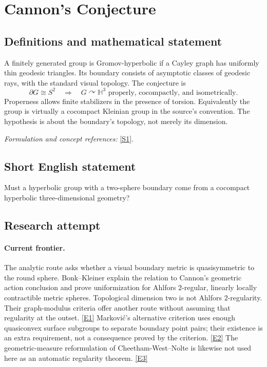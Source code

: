 \documentclass[11pt,a4paper]{article}
\newcommand{\sref}[2]{\hyperlink{source:#1:#2}{[S#2]}}
\newcommand{\eref}[2]{\hyperlink{extra:#1:#2}{[E#2]}}
\newif\ifshowcatalogue
\newcommand{\cataloguescope}[1]{\ifshowcatalogue
 \paragraph{Exact scope in the supplied catalogue.}
 \begin{quote}\small #1\end{quote}\fi}
\numberwithin{equation}{section}
\begin{document}
\setcounter{section}{0}
\clearpage
\section*{\texorpdfstring{Cannon's Conjecture}{Cannon's Conjecture}}\label{statement}
\subsection{Definitions and mathematical statement}
A finitely generated group is Gromov-hyperbolic if a Cayley graph has uniformly thin geodesic triangles. Its boundary consists of asymptotic classes of geodesic rays, with the standard visual topology. The conjecture is
\[
 \partial G\cong S^2\quad\Longrightarrow\quad
 G\curvearrowright\mathbb H^3\text{ properly, cocompactly, and isometrically}.
\]
Properness allows finite stabilizers in the presence of torsion. Equivalently the group is virtually a cocompact Kleinian group in the source's convention. The hypothesis is about the boundary's topology, not merely its dimension.
\par\smallskip\textit{Formulation and concept references:} \sref{statement}{1}.
\cataloguescope{Prove or disprove that every Gromov-hyperbolic group whose boundary at infinity is homeomorphic to the two-sphere acts properly discontinuously, cocompactly, and isometrically on hyperbolic three-space, equivalently is virtually a cocompact Kleinian group.}
\subsection{Short English statement}
Must a hyperbolic group with a two-sphere boundary come from a cocompact hyperbolic three-dimensional geometry?
\subsection{Research attempt}

\paragraph{Current frontier.}
The analytic route asks whether a visual boundary metric is quasisymmetric
to the round sphere. Bonk--Kleiner explain the relation to Cannon's geometric
action conclusion and prove uniformization for Ahlfors $2$-regular, linearly
locally contractible metric spheres. Topological dimension two is not
Ahlfors $2$-regularity. Their graph-modulus criteria offer another route
without assuming that regularity at the outset. \eref{statement}{1}
Markovi\'c's alternative criterion uses enough quasiconvex surface subgroups
to separate boundary point pairs; their existence is an extra requirement,
not a consequence proved by the criterion. \eref{statement}{2}
The geometric-measure reformulation of Cheetham-West--Nolte is likewise
not used here as an automatic regularity theorem. \eref{statement}{3}
\end{document}
